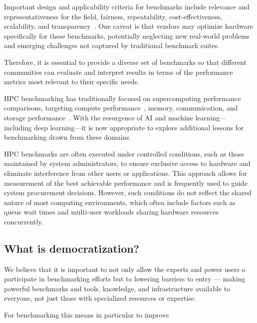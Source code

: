 Important design and applicability criteria for benchmarks include relevance and representativeness for the field, fairness, repeatability, cost-effectiveness, scalability, and transparency~\cite{wikipedia:benchmarking}. One caveat is that vendors may optimize hardware specifically for these benchmarks, potentially neglecting new real-world problems and emerging challenges not captured by traditional benchmark suites.  

Therefore, it is essential to provide a diverse set of benchmarks so that different communities can evaluate and interpret results in terms of the performance metrics most relevant to their specific needs.  

HPC benchmarking has traditionally focused on supercomputing performance comparisons, targeting compute performance~\cite{Dongarra1989LinpackReport,Dongarra2016HPCG}, memory, communication, and storage performance~\cite{PerfKitBenchmarker,IO500}. With the resurgence of AI and machine learning—including deep learning—it is now appropriate to explore additional lessons for benchmarking drawn from these domains.  

HPC benchmarks are often executed under controlled conditions, such as those maintained by system administrators, to ensure exclusive access to hardware and eliminate interference from other users or applications. This approach allows for measurement of the best achievable performance and is frequently used to guide system procurement decisions. However, such conditions do not reflect the shared nature of most computing environments, which often include factors such as queue wait times and multi-user workloads sharing hardware resources concurrently.


\subsection{What is democratization?}
\label{sec:definition-democratization}

We believe that it is important  to not only allow the experts and power users o participate in benchmarking efforts but to  lowering barriers to entry — making powerful benchmarks and tools, knowledge, and infrastructure available to everyone, not just those with specialized resources or expertise.

For benchmarking this means in particular to improve

